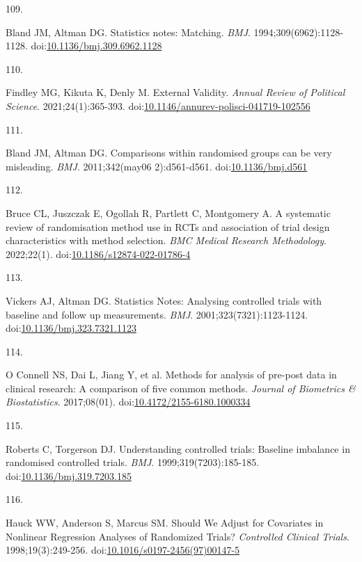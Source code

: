 \documentclass[
]{book}
\newlength{\cslhangindent}
\newlength{\csllabelwidth}
\newlength{\cslentryspacingunit} %
\newenvironment{CSLReferences}[2] %
 {%
  \setlength{\parindent}{0pt}
  \ifodd #1
  \let\oldpar\par
  \def\par{\hangindent=\cslhangindent\oldpar}
  \fi
  \setlength{\parskip}{#2\cslentryspacingunit}
 }%
 {}
\newcommand{\CSLLeftMargin}[1]{\parbox[t]{\csllabelwidth}{#1}}
\newcommand{\CSLRightInline}[1]{\parbox[t]{\linewidth - \csllabelwidth}{#1}\break}
\begin{document}
\begin{CSLReferences}{0}{0}
\leavevmode{}%
\CSLLeftMargin{109. }%
\CSLRightInline{Bland JM, Altman DG. Statistics notes: Matching. \emph{BMJ}. 1994;309(6962):1128-1128. doi:\href{https://doi.org/10.1136/bmj.309.6962.1128}{10.1136/bmj.309.6962.1128}}

\leavevmode{}%
\CSLLeftMargin{110. }%
\CSLRightInline{Findley MG, Kikuta K, Denly M. External Validity. \emph{Annual Review of Political Science}. 2021;24(1):365-393. doi:\href{https://doi.org/10.1146/annurev-polisci-041719-102556}{10.1146/annurev-polisci-041719-102556}}

\leavevmode{}%
\CSLLeftMargin{111. }%
\CSLRightInline{Bland JM, Altman DG. Comparisons within randomised groups can be very misleading. \emph{BMJ}. 2011;342(may06 2):d561-d561. doi:\href{https://doi.org/10.1136/bmj.d561}{10.1136/bmj.d561}}

\leavevmode{}%
\CSLLeftMargin{112. }%
\CSLRightInline{Bruce CL, Juszczak E, Ogollah R, Partlett C, Montgomery A. A systematic review of randomisation method use in RCTs and association of trial design characteristics with method selection. \emph{BMC Medical Research Methodology}. 2022;22(1). doi:\href{https://doi.org/10.1186/s12874-022-01786-4}{10.1186/s12874-022-01786-4}}

\leavevmode{}%
\CSLLeftMargin{113. }%
\CSLRightInline{Vickers AJ, Altman DG. Statistics Notes: Analysing controlled trials with baseline and follow up measurements. \emph{BMJ}. 2001;323(7321):1123-1124. doi:\href{https://doi.org/10.1136/bmj.323.7321.1123}{10.1136/bmj.323.7321.1123}}

\leavevmode{}%
\CSLLeftMargin{114. }%
\CSLRightInline{O Connell NS, Dai L, Jiang Y, et al. Methods for analysis of pre-post data in clinical research: A comparison of five common methods. \emph{Journal of Biometrics \& Biostatistics}. 2017;08(01). doi:\href{https://doi.org/10.4172/2155-6180.1000334}{10.4172/2155-6180.1000334}}

\leavevmode{}%
\CSLLeftMargin{115. }%
\CSLRightInline{Roberts C, Torgerson DJ. Understanding controlled trials: Baseline imbalance in randomised controlled trials. \emph{BMJ}. 1999;319(7203):185-185. doi:\href{https://doi.org/10.1136/bmj.319.7203.185}{10.1136/bmj.319.7203.185}}

\leavevmode{}%
\CSLLeftMargin{116. }%
\CSLRightInline{Hauck WW, Anderson S, Marcus SM. Should We Adjust for Covariates in Nonlinear Regression Analyses of Randomized Trials? \emph{Controlled Clinical Trials}. 1998;19(3):249-256. doi:\href{https://doi.org/10.1016/s0197-2456(97)00147-5}{10.1016/s0197-2456(97)00147-5}}


\end{CSLReferences}
\end{document}

